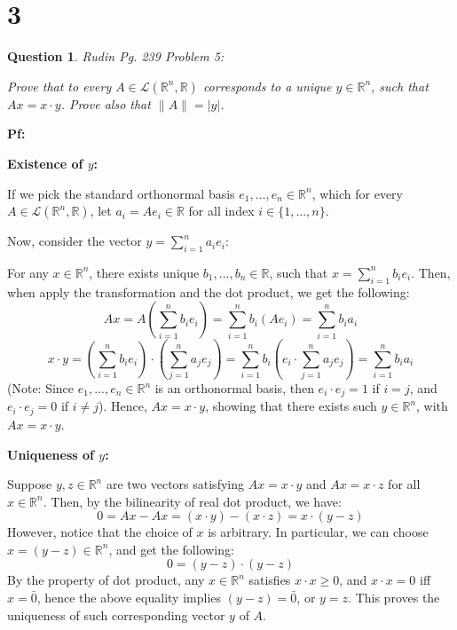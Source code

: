 \documentclass{article}
\newtheorem{question}{Question}
\begin{document}
\hfil

\hfil

\section*{3}
\begin{myBox}[]{}
    \begin{question}
        Rudin Pg. 239 Problem 5:

        Prove that to every $A\in\mathcal{L}(\mathbb{R}^n,\mathbb{R})$ corresponds to a unique $y\in\mathbb{R}^n$, such that $Ax = x\cdot y$.
        Prove also that $\|A\|=|y|$.
    \end{question}
\end{myBox}

\textbf{Pf:}

\textbf{Existence of $y$:}

If we pick the standard orthonormal basis $e_1,...,e_n\in\mathbb{R}^n$, which for every $A\in\mathcal{L}(\mathbb{R}^n,\mathbb{R})$, let $a_i=A e_i\in\mathbb{R}$ for all index $i\in\{1,...,n\}$.

Now, consider the vector $y=\sum_{i=1}^{n}a_ie_i$:

For any $x\in\mathbb{R}^n$, there exists unique $b_1,...,b_n\in\mathbb{R}$, such that $x=\sum_{i=1}^{n}b_ie_i$. Then, when apply the transformation and the dot product, we get the following:
$$Ax = A\left(\sum_{i=1}^{n}b_ie_i\right)=\sum_{i=1}^{n}b_i(Ae_i)=\sum_{i=1}^{n}b_ia_i$$
$$x\cdot y = \left(\sum_{i=1}^{n}b_ie_i\right)\cdot \left(\sum_{j=1}^{n}a_je_j\right)=\sum_{i=1}^{n}b_i\left(e_i\cdot \sum_{j=1}^{n}a_je_j\right) = \sum_{i=1}^{n}b_ia_i$$
(Note: Since $e_1,...,e_n\in\mathbb{R}^n$ is an orthonormal basis, then $e_i\cdot e_j=1$ if $i=j$, and $e_i\cdot e_j=0$ if $i\neq j$).
Hence, $Ax = x\cdot y$, showing that there exists such $y\in\mathbb{R}^n$, with $Ax = x\cdot y$.

\hfil

\textbf{Uniqueness of $y$:}

Suppose $y,z\in\mathbb{R}^n$ are two vectors satisfying $Ax = x\cdot y$ and $Ax = x\cdot z$ for all $x\in\mathbb{R}^n$. Then, by the bilinearity of real dot product, we have:
$$0=Ax-Ax = (x\cdot y)-(x\cdot z)=x\cdot (y-z)$$
However, notice that the choice of $x$ is arbitrary. In particular, we can choose $x=(y-z)\in\mathbb{R}^n$, and get the following:
$$0 = (y-z)\cdot (y-z)$$
By the property of dot product, any $x\in\mathbb{R}^n$ satisfies $x\cdot x\geq 0$, and $x\cdot x=0$ iff $x=\bar{0}$, hence the above equality implies $(y-z)=\bar{0}$, or $y=z$.
This proves the uniqueness of such corresponding vector $y$ of $A$.
\end{document}
